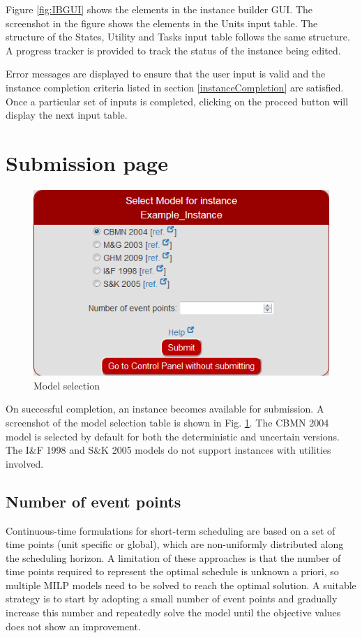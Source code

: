 Figure \ref{fig:IBGUI} shows the elements in the instance builder GUI. The screenshot in the figure shows the elements in the Units input table. The structure of the States, Utility and Tasks input table follows the same structure. A progress tracker is provided to track the status of the instance being edited. 

Error messages are displayed to ensure that the user input is valid and the instance completion criteria listed in section \ref{instanceCompletion} are satisfied.
 Once a particular set of inputs is completed, clicking on the proceed button will display the next input table.






\section{Submission page}

\begin{figure}[htbp]
\centering
\includegraphics[width=0.8\linewidth]{Images/SelectModel.png}
\caption{Model selection}
\label{fig:selectModel}
\end{figure}

On successful completion, an instance becomes available for submission. A screenshot of the model selection table is shown in Fig. \ref{fig:selectModel}. The CBMN 2004 model is selected by default for both the deterministic and uncertain versions. The I\&F 1998 and S\&K 2005 models do not support instances with utilities involved.

\subsection{Number of event points}

Continuous-time formulations for short-term scheduling are based on a set of time points (unit specific or global), which are non-uniformly distributed along the scheduling horizon. A limitation of these approaches is that the number of time points required to represent the optimal schedule is unknown a priori, so multiple MILP models need to be solved to reach the optimal solution. A suitable strategy is to start by adopting a small number of event points and gradually increase this number and repeatedly solve the model until the objective values does not show an improvement.





